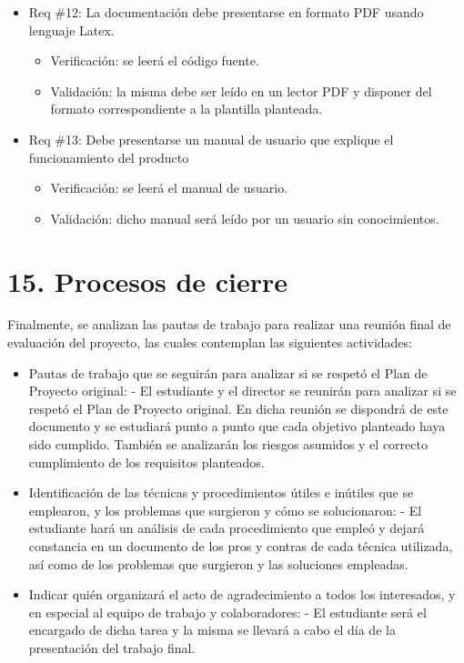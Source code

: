 \documentclass[
11pt, %
]{charter}
\begin{document}
\begin{itemize}
\item Req \#12: La documentación debe presentarse en formato PDF usando lenguaje Latex.
\begin{itemize}
	\item Verificación: se leerá el código fuente.
	\item Validación: la misma debe ser leído en un lector PDF y disponer del formato correspondiente a la plantilla planteada.
\end{itemize}

\item Req \#13: Debe presentarse un manual de usuario que explique el funcionamiento del producto
\begin{itemize}
	\item Verificación: se leerá el manual de usuario.
	\item Validación: dicho manual será leído por un usuario sin conocimientos.
\end{itemize}
\end{itemize}


\section{15. Procesos de cierre}    
\label{sec:cierre}

Finalmente, se analizan las pautas de trabajo para realizar una reunión final de evaluación del proyecto, las cuales contemplan las siguientes actividades:

\begin{itemize}
	\item Pautas de trabajo que se seguirán para analizar si se respetó el Plan de Proyecto original:
	 - El estudiante y el director se reunirán para analizar si se respetó el Plan de Proyecto original. En dicha reunión se dispondrá de este documento y se estudiará punto a punto que cada objetivo planteado haya sido cumplido. También se analizarán los riesgos asumidos y el correcto cumplimiento de los requisitos planteados.
	 
	\item Identificación de las técnicas y procedimientos útiles e inútiles que se emplearon, y los problemas que surgieron y cómo se solucionaron:
	 - El estudiante hará un análisis de cada procedimiento que empleó y dejará constancia en un documento de los pros y contras de cada técnica utilizada, así como de los problemas que surgieron y las soluciones empleadas.
	 
	\item Indicar quién organizará el acto de agradecimiento a todos los interesados, y en especial al equipo de trabajo y colaboradores:
	  - El estudiante será el encargado de dicha tarea y la misma se llevará a cabo el día de la presentación del trabajo final.
\end{itemize}
\end{document}
